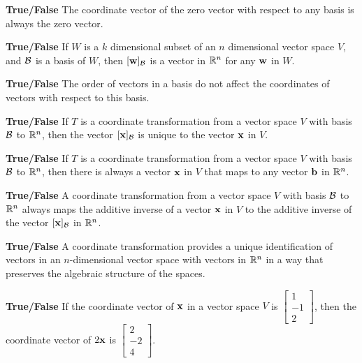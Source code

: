 \item \textbf{True/False} The coordinate vector of the zero vector with respect to any basis is always the zero vector.

\item \textbf{True/False} If $W$ is a $k$ dimensional subset of an $n$ dimensional vector space $V$, and $\mathcal{B}$ is a basis of $W$, then $[\mathbf{w}]_{\mathcal{B}}$ is a vector in $\mathbb{R}^n$ for any $\mathbf{w}$ in $W$.

\item \textbf{True/False} The order of vectors in a basis do not affect the coordinates of vectors with respect to this basis.

\item \textbf{True/False} If $T$ is a coordinate transformation from a vector space $V$ with basis $\mathcal{B}$ to $\mathbb{R}^n$, then the vector $[\mathbf{x}]_{\mathcal{B}}$ is unique to the vector $\mathbf{x}$ in $V$. 

\item \textbf{True/False}  If $T$ is a coordinate transformation from a vector space $V$ with basis $\mathcal{B}$ to $\mathbb{R}^n$, then there is always a vector $\mathbf{x}$ in $V$ that maps to any vector $\mathbf{b}$ in $\mathbb{R}^n$. 

\item \textbf{True/False}  A coordinate transformation from a vector space $V$ with basis $\mathcal{B}$ to $\mathbb{R}^n$ always maps the additive inverse of a vector $\mathbf{x}$ in $V$ to the additive inverse of the vector $[\mathbf{x}]_{\mathcal{B}}$ in $\mathbb{R}^n$. 

\item \textbf{True/False} A coordinate transformation provides a unique identification of vectors in an $n$-dimensional vector space with vectors in $\mathbb{R}^n$ in a way that preserves the algebraic structure of the spaces.  

\item \textbf{True/False} If the coordinate vector of $\mathbf{x}$ in a vector space $V$ is $\left[ \begin{array}{r} 1\\-1\\2 \end{array} \right]$, then the coordinate vector of $2\mathbf{x}$ is $\left[ \begin{array}{r} 2\\-2\\4 \end{array} \right]$.


\ea


\ee

\label{sec:proj_sum_powers}

